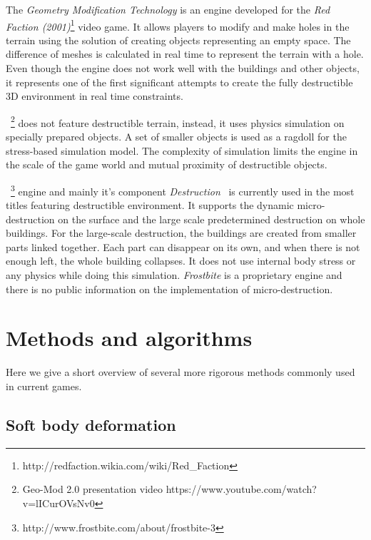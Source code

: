  The \emph{Geometry Modification Technology}\cite{geomod}  is an engine developed for the \emph{Red Faction (2001)}\footnote{http://redfaction.wikia.com/wiki/Red\_Faction} video game. It allows players to modify and make holes in the terrain using the solution of creating objects representing an empty space. The difference of meshes is calculated in real time to represent the terrain with a hole. Even though the engine does not work well with the buildings and other objects, it represents one of the first significant attempts to create the fully destructible 3D environment in real time constraints.

~\cite{geomod}\footnote{Geo-Mod 2.0 presentation video https://www.youtube.com/watch?v=lICurOVsNv0} does not feature destructible terrain, instead, it uses physics simulation on specially prepared objects. A set of smaller objects is used as a ragdoll for the stress-based simulation model. The complexity of simulation limits the engine in the scale of the game world and mutual proximity of destructible objects.


~\footnote{http://www.frostbite.com/about/frostbite-3} engine and mainly it's component \emph{Destruction}~\cite{destruction} is currently used in the most titles featuring destructible environment. It supports the dynamic micro-destruction on the surface and the large scale predetermined destruction on whole buildings. For the large-scale destruction, the buildings are created from smaller parts linked together. Each part can disappear on its own, and when there is not enough left, the whole building collapses. It does not use internal body stress or any physics while doing this simulation. \emph{Frostbite} is a proprietary engine and there is no public information on the implementation of micro-destruction.

\section{Methods and algorithms}

Here we give a short overview of several more rigorous methods commonly used in current games.

\subsection{Soft body deformation}

